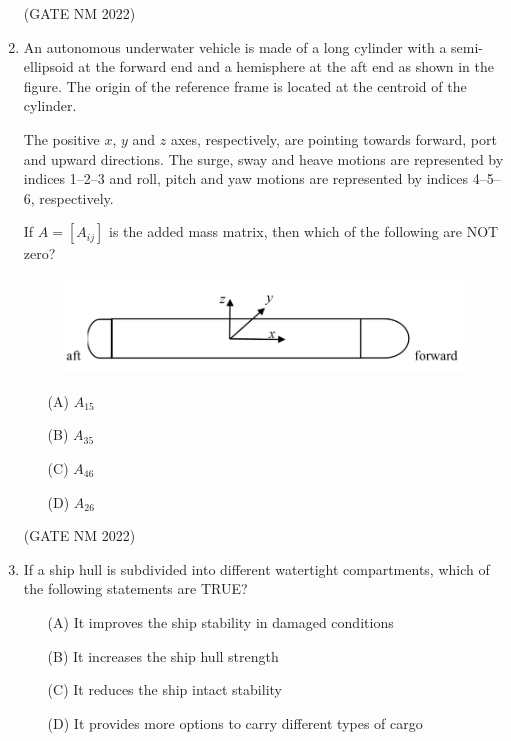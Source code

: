 \documentclass[journal,12pt,onecolumn]{IEEEtran}
\theoremstyle{remark}
\begin{document}
\begin{enumerate}
\hfill(GATE NM 2022)


\item  An autonomous underwater vehicle is made of a long cylinder with a semi-ellipsoid at the forward end and a hemisphere at the aft end as shown in the figure.  
The origin of the reference frame is located at the centroid of the cylinder.  

The positive $x$, $y$ and $z$ axes, respectively, are pointing towards forward, port and upward directions.  
The surge, sway and heave motions are represented by indices 1--2--3 and roll, pitch and yaw motions are represented by indices 4--5--6, respectively.  

If $A = [A_{ij}]$ is the added mass matrix, then which of the following are NOT zero?

\begin{figure}[h]
	\centering
	\includegraphics[width=0.3\columnwidth]{fig6}
	\caption{}
	\label{fig:placeholder}
\end{figure}

\begin{multicols}{4}

\begin{enumerate}
    \item[(A)]  $A_{15}$
    \item[(B)]  $A_{35}$
    \item[(C)]  $A_{46}$
    \item[(D)]  $A_{26}$
\end{enumerate}

\end{multicols}

\hfill(GATE NM 2022)



\item  If a ship hull is subdivided into different watertight compartments, which of the following statements are TRUE?

\begin{enumerate}
    \item[(A)] It improves the ship stability in damaged conditions
    \item[(B)] It increases the ship hull strength
    \item[(C)] It reduces the ship intact stability
    \item[(D)] It provides more options to carry different types of cargo
\end{enumerate}


\end{enumerate}
\end{document}
